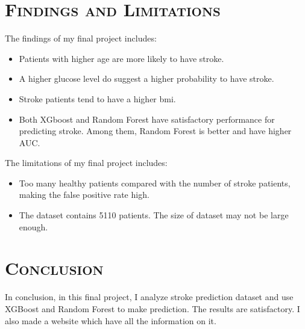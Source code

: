 \documentclass[a4paper,12pt]{article}
\begin{document}
\section{\textsc{Findings and Limitations}}
The findings of my final project includes:
\begin{itemize}
\item Patients with higher age are more likely to have stroke.
\item A higher glucose level do suggest a higher probability to have stroke.
\item Stroke patients tend to have a higher bmi.
\item Both XGboost and Random Forest have satisfactory performance for predicting stroke. Among them, Random Forest is better and have higher AUC.
\end{itemize}

The limitations of my final project includes:
\begin{itemize}
\item Too many healthy patients compared with the number of stroke patients, making the false positive rate high.
\item The dataset contains 5110 patients. The size of dataset may not be large enough.
\end{itemize}


\section{\textsc{Conclusion}}
In conclusion, in this final project, I analyze stroke prediction dataset and use XGBoost and Random Forest to make prediction. The results are satisfactory. I also made a website which have all the information on it. 








\end{document}
